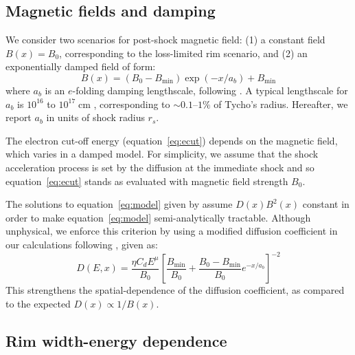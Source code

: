 \documentclass[iop, apj, numberedappendix]{emulateapj}
\newcommand*{\mt}{\mathrm}
\newcommand*{\unit}[1]{\;\mt{#1}}  %
\newcommand*{\abt}{\mathord{\sim}} %
\newcommand*{\Bmin}{B_{\mt{min}}}
\begin{document}
\subsection{Magnetic fields and damping}

We consider two scenarios for post-shock magnetic field: (1) a constant field
$B(x) = B_0$, corresponding to the loss-limited rim scenario, and (2) an
exponentially damped field of form:
\begin{equation} \label{eq:bdamp}
    B(x) = \left(B_0 - \Bmin\right) \exp\left(-x / a_b\right)
           + \Bmin
\end{equation}
where $a_b$ is an $e$-folding damping lengthscale, following \citet{pohl2005}.
A typical lengthscale for $a_b$ is $10^{16}$ to $10^{17} \unit{cm}$
\citep{pohl2005}, corresponding to $\abt 0.1$--$1\%$ of Tycho's radius.
Hereafter, we report $a_b$ in units of shock radius $r_s$.

The electron cut-off energy (equation~\eqref{eq:ecut}) depends on the magnetic
field, which varies in a damped model.  For simplicity, we assume that the
shock acceleration process is set by the diffusion at the immediate shock and
so equation~\eqref{eq:ecut} stands as evaluated with magnetic field strength
$B_0$.

The solutions to equation~\eqref{eq:model} given by \citet{lerche1980,
rettig2012} assume $D(x) B^2(x)$ constant in order to make
equation~\eqref{eq:model} semi-analytically tractable.  Although unphysical, we
enforce this criterion by using a modified diffusion coefficient in our
calculations following
\citet{rettig2012}, given as:
\begin{equation} \label{eq:ddamp}
    D(E,x) = \frac{\eta C_d E^\mu}{B_0}
             \left[ \frac{\Bmin}{B_0} +
                    \frac{B_0 - \Bmin}{B_0} e^{-x/a_b} \right]^{-2}
\end{equation}
This strengthens the spatial-dependence of the diffusion coefficient, as
compared to the expected $D(x) \propto 1/B(x)$.

\subsection{Rim width-energy dependence} \label{sec:energydep}
\end{document}
